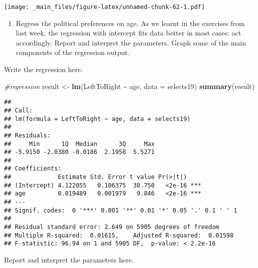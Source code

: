 \documentclass[
]{book}
\newenvironment{Shaded}{\begin{snugshade}}{\end{snugshade}}
\newcommand{\AttributeTok}[1]{\textcolor[rgb]{0.13,0.29,0.53}{#1}}
\newcommand{\CommentTok}[1]{\textcolor[rgb]{0.56,0.35,0.01}{\textit{#1}}}
\newcommand{\FunctionTok}[1]{\textcolor[rgb]{0.13,0.29,0.53}{\textbf{#1}}}
\newcommand{\NormalTok}[1]{#1}
\newcommand{\OtherTok}[1]{\textcolor[rgb]{0.56,0.35,0.01}{#1}}
\newcommand{\SpecialCharTok}[1]{\textcolor[rgb]{0.81,0.36,0.00}{\textbf{#1}}}
\providecommand{\tightlist}{%
  \setlength{\itemsep}{0pt}\setlength{\parskip}{0pt}}
\begin{document}
\texttt{[image: \_main\_files/figure-latex/unnamed-chunk-62-1.pdf]}

\begin{enumerate}
\def\labelenumi{\arabic{enumi}.}
\setcounter{enumi}{2}
\tightlist
\item
  Regress the political preferences on age. As we learnt in the exercises from last week, the regression with intercept fits data better in most cases: act accordingly. Report and interpret the parameters. Graph some of the main components of the regression output.
\end{enumerate}

Write the regression here.

\begin{Shaded}
\begin{Highlighting}[]
\CommentTok{\#regression}
\NormalTok{result }\OtherTok{\textless{}{-}} \FunctionTok{lm}\NormalTok{(LeftToRight }\SpecialCharTok{\textasciitilde{}}\NormalTok{ age, }\AttributeTok{data =}\NormalTok{ selects19)}
\FunctionTok{summary}\NormalTok{(result)}
\end{Highlighting}
\end{Shaded}

\begin{verbatim}
## 
## Call:
## lm(formula = LeftToRight ~ age, data = selects19)
## 
## Residuals:
##     Min      1Q  Median      3Q     Max 
## -5.9150 -2.0380 -0.0186  2.1958  5.5271 
## 
## Coefficients:
##             Estimate Std. Error t value Pr(>|t|)    
## (Intercept) 4.122055   0.106375  38.750   <2e-16 ***
## age         0.019489   0.001979   9.846   <2e-16 ***
## ---
## Signif. codes:  0 '***' 0.001 '**' 0.01 '*' 0.05 '.' 0.1 ' ' 1
## 
## Residual standard error: 2.649 on 5905 degrees of freedom
## Multiple R-squared:  0.01615,    Adjusted R-squared:  0.01598 
## F-statistic: 96.94 on 1 and 5905 DF,  p-value: < 2.2e-16
\end{verbatim}

Report and interpret the parameters here.
\end{document}
